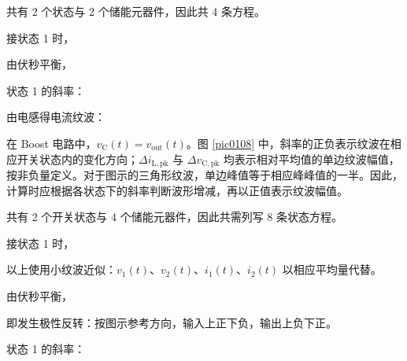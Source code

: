 \newpage{}




共有 2 个状态与 2 个储能元器件，因此共 4 条方程。


接状态 1 时，


由伏秒平衡，



状态 1 的斜率：

由电感得电流纹波：

在 Boost 电路中，$v_{\mathrm{C}}(t)=v_{\mathrm{out}}(t)$。图 \ref{pic0108} 中，斜率的正负表示纹波在相应开关状态内的变化方向；$\Delta i_{\mathrm{L,pk}}$ 与 $\Delta v_{\mathrm{C,pk}}$ 均表示相对平均值的单边纹波幅值，按非负量定义。对于图示的三角形纹波，单边峰值等于相应峰峰值的一半。因此，计算时应根据各状态下的斜率判断波形增减，再以正值表示纹波幅值。

\newpage{}




共有 2 个开关状态与 4 个储能元器件，因此共需列写 8 条状态方程。


接状态 1 时，

以上使用小纹波近似：$v_1(t)$、$v_2(t)$、$i_1(t)$、$i_2(t)$ 以相应平均量代替。


由伏秒平衡，
\begingroup
\allowdisplaybreaks[4]
\endgroup

即发生极性反转：按图示参考方向，输入上正下负，输出上负下正。



状态 1 的斜率：

